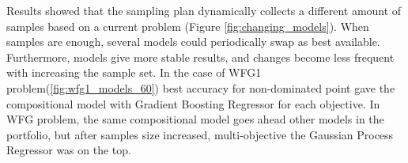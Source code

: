 


    Results showed that the sampling plan dynamically collects a different amount of samples based on a current problem (Figure \ref{fig:changing_models}). When samples are enough, several models could periodically swap as best available. Furthermore, models give more stable results, and changes become less frequent with increasing the sample set. In the case of WFG1 problem(\ref{fig:wfg1_models_60}) best accuracy for non-dominated point gave the compositional model with Gradient Boosting Regressor for each objective. In WFG problem, the same compositional model goes ahead other models in the portfolio, but after samples size increased, multi-objective the Gaussian Process Regressor was on the top.

